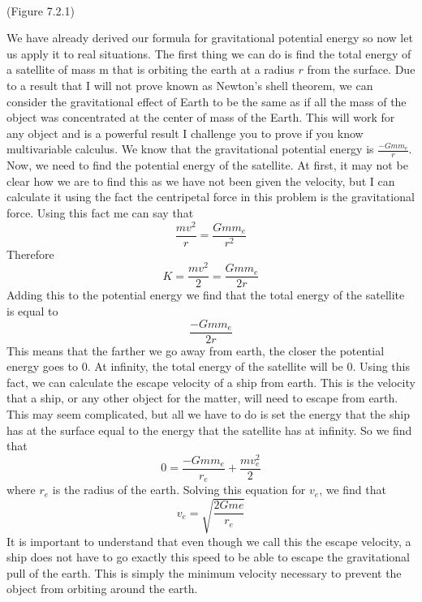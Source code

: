 \
\
\
\begin{center}
(Figure 7.2.1)
\end{center}

We have already derived our formula for gravitational potential energy so now let us apply it to real situations. The first thing we can do is find the total energy of a satellite of mass m that is orbiting the earth at a radius $r$ from the surface. Due to a result that I will not prove known as Newton’s shell theorem, we can consider the gravitational effect of Earth to be the same as if all the mass of the object was concentrated at the center of mass of the Earth. This will work for any object and is a powerful result I challenge you to prove if you know multivariable calculus. 
We know that the gravitational potential energy is $\frac{-Gm m_e}{r}$. Now, we need to find the potential energy of the satellite. At first, it may not be clear how we are to find this as we have not been given the velocity, but I can calculate it using the fact the centripetal force in this problem is the gravitational force. Using this fact me can say that \begin{equation}\frac{mv^2}{r}=\frac{Gmm_e}{r^2}\end{equation} Therefore \begin{equation}K=\frac{mv^2}{2} = \frac{G m m_e}{2r}\end{equation} Adding this to the potential energy we find that the total energy of the satellite is equal to $$\frac{-G m m_e}{2r}$$ This means that the farther we go away from earth, the closer the potential energy goes to 0. At infinity, the total energy of the satellite will be 0. 
Using this fact, we can calculate the escape velocity of a ship from earth. This is the velocity that a ship, or any other object for the matter, will need to escape from earth. This may seem complicated, but all we have to do is set the energy that the ship has at the surface equal to the energy that the satellite has at infinity. So we find that \begin{equation}0=\frac{-G m m_e}{r_e}+\frac{mv_{e}^2}{2}\end{equation} where $r_e$ is the radius of the earth. Solving this equation for $v_e$, we find that $$v_e=\sqrt{\frac{2Gme}{r_e}}$$ It is important to understand that even though we call this the escape velocity, a ship does not have to go exactly this speed to be able to escape the gravitational pull of the earth. This is simply the minimum velocity necessary to prevent the object from orbiting around the earth. 
